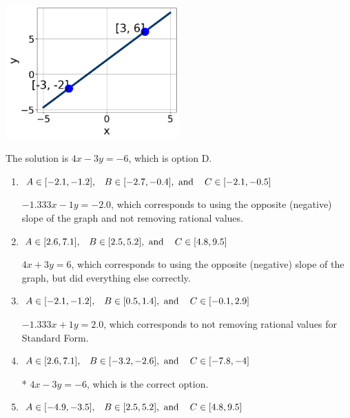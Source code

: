 \documentclass{extbook}[14pt]
\begin{document}
\begin{enumerate}
{\begin{center}
    \includegraphics[width=0.5\textwidth]{../Figures/linearGraphToStandardCopyB.png}
\end{center}


The solution is \( 4x - 3y = -6 \), which is option D.\begin{enumerate}[label=\Alph*.]
\item \( A \in [-2.1, -1.2], \hspace{3mm} B \in [-2.7, -0.4], \text{ and } \hspace{3mm} C \in [-2.1, -0.5] \)

 $-1.333x - 1y = -2.0$, which corresponds to using the opposite (negative) slope of the graph and not removing rational values.
\item \( A \in [2.6, 7.1], \hspace{3mm} B \in [2.5, 5.2], \text{ and } \hspace{3mm} C \in [4.8, 9.5] \)

 $4x + 3y = 6$, which corresponds to using the opposite (negative) slope of the graph, but did everything else correctly.
\item \( A \in [-2.1, -1.2], \hspace{3mm} B \in [0.5, 1.4], \text{ and } \hspace{3mm} C \in [-0.1, 2.9] \)

 $-1.333x + 1y = 2.0$, which corresponds to not removing rational values for Standard Form.
\item \( A \in [2.6, 7.1], \hspace{3mm} B \in [-3.2, -2.6], \text{ and } \hspace{3mm} C \in [-7.8, -4] \)

* $4x - 3y = -6$, which is the correct option.
\item \( A \in [-4.9, -3.5], \hspace{3mm} B \in [2.5, 5.2], \text{ and } \hspace{3mm} C \in [4.8, 9.5] \)


\end{enumerate}}
\end{enumerate}
\end{document}
